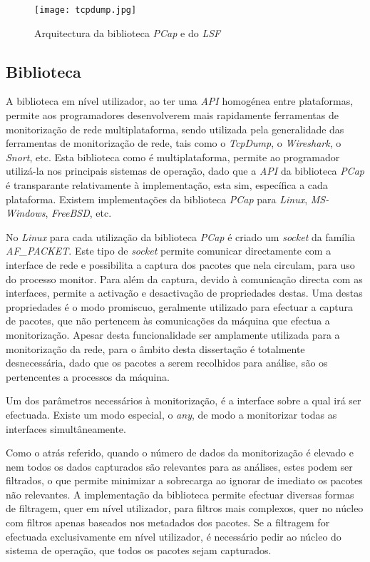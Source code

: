 \begin{figure}[htbp]
       \centering
       \texttt{[image: tcpdump.jpg]}
       \caption{Arquitectura da biblioteca \textit{PCap} e do \textit{LSF}}
      \label{fig:pcap_architecture}
\end{figure}

\subsection{Biblioteca}

A biblioteca em nível utilizador, ao ter uma \textit{API} homogénea entre plataformas, permite aos programadores desenvolverem mais rapidamente ferramentas de monitorização de rede multiplataforma, sendo utilizada pela generalidade das ferramentas de monitorização de rede, tais como o \textit{TcpDump}, o \textit{Wireshark}, o \textit{Snort}, etc.
Esta biblioteca como é multiplataforma, permite ao programador utilizá-la nos principais sistemas de operação, dado que a \textit{API} da biblioteca \textit{PCap} é transparante relativamente à implementação, esta sim, específica a cada plataforma.
Existem implementações da biblioteca \textit{PCap} para \textit{Linux}, \textit{MS-Windows}, \textit{FreeBSD}, etc.

No \textit{Linux} para cada utilização da biblioteca \textit{PCap} é criado um \textit{socket} da família \textit{AF\_PACKET}.
Este tipo de \textit{socket} permite comunicar directamente com a interface de rede e possibilita a captura dos pacotes que nela circulam, para uso do processo monitor.
Para além da captura, devido à comunicação directa com as interfaces, permite a activação e desactivação de propriedades destas.
Uma destas propriedades é o modo promiscuo, geralmente utilizado para efectuar a captura de pacotes, que não pertencem às comunicações da máquina que efectua a monitorização.
Apesar desta funcionalidade ser amplamente utilizada para a monitorização da rede, para o âmbito desta dissertação é totalmente desnecessária, dado que os pacotes a serem recolhidos para análise, são os pertencentes a processos da máquina.

Um dos parâmetros necessários à monitorização, é a interface sobre a qual irá ser efectuada.
Existe um modo especial, o \textit{any}, de modo a monitorizar todas as interfaces simultâneamente.

Como o atrás referido, quando o número de dados da monitorização é elevado e nem todos os dados capturados são relevantes para as análises, estes podem ser filtrados, o que permite minimizar a sobrecarga ao ignorar de imediato os pacotes não relevantes.
A implementação da biblioteca permite efectuar diversas formas de filtragem, quer em nível utilizador, para filtros mais complexos, quer no núcleo com filtros apenas baseados nos metadados dos pacotes.
Se a filtragem for efectuada exclusivamente em nível utilizador, é necessário pedir ao núcleo do sistema de operação, que todos os pacotes sejam capturados.

